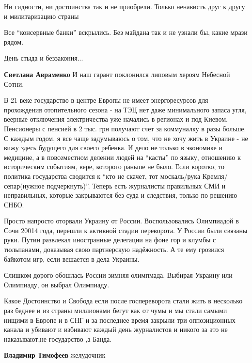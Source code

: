 \begin{itemize}
Ни гидности, ни достоинства так и не приобрели. Только ненависть друг к другу и милитаризацию страны

Все \enquote{консервные банки} вскрылись. Без майдана так и не узнали бы, какие мрази рядом.

День стыда и беззакония...

\begin{itemize} %
\textbf{Светлана Авраменко} И наш гарант поклонился липовым хероям Небесной Сотни.
\end{itemize} %


В 21 веке государство в центре Европы не имеет энергоресурсов для прохождения
отопительного сезона - на ТЭЦ нет даже минимального запаса угля, веерные
отключения электричества уже начались в регионах и под Киевом. Пенсионеры с
пенсией в 2 тыс. грн получают счет за коммуналку в разы больше. С каждым годом,
я все чаще задумываюсь о том, что не хочу жить в Украине - не вижу здесь
будущего для своего ребенка. И дело не только в экономике и медицине, а в
повсеместном делении людей на \enquote{касты} по языку, отношению к историческим
событиям, вере, которого раньше не было. Если коротко, то политика государства
сводится к \enquote{кто не скачет, тот москаль/рука Кремля/сепар(нужное
подчеркнуть)}. Теперь есть журналисты правильных СМИ и неправильных, которые
закрываются без суда и следствия, только по решению СНБО.



Просто напросто оторвали Украину от России. Воспользовались Олимпиадой в Сочи
20014 года, перешли к активной стадии переворота. У России были связаны руки.
Путин развлекал иностранные делегации на фоне гор и клумбы с тюльпанами,
доказывая свою партнерскую надёжность. А те ему грозился байкотом игр, если
вешается в дела Украины.

Слишком дорого обошлась России зимняя олимпмада. Выбирая Украину или Олимпиаду,
он выбрал Олимпиаду.


Какое Достоинство и Свобода если после госпереворота стали жить в несколько раз
беднее и из страны миллионами бегут как от чумы и мы стали самыми нищими в
Европе и в СНГ и за последнее время закрыли три оппозиционных канала и убивают
и избивают каждый день журналистов и никого за это не наказывают,не государство
,а Банда.

\textbf{Владимир Тимофеев} желудочник

\end{itemize} %
